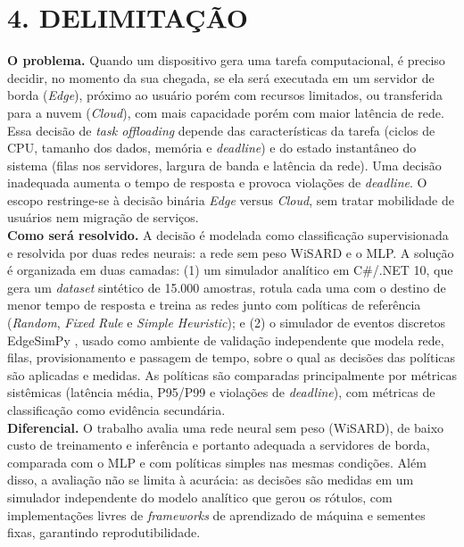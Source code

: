 \documentclass[12pt,a4paper]{article}
\begin{document}
\section*{\bfseries 4. DELIMITAÇÃO}
\textbf{O problema.} Quando um dispositivo gera uma tarefa computacional, é preciso decidir,
no momento da sua chegada, se ela será executada em um servidor de borda (\textit{Edge}),
próximo ao usuário porém com recursos limitados, ou transferida para a nuvem (\textit{Cloud}),
com mais capacidade porém com maior latência de rede. Essa decisão de \textit{task offloading}
depende das características da tarefa (ciclos de CPU, tamanho dos dados, memória e
\textit{deadline}) e do estado instantâneo do sistema (filas nos servidores, largura de banda e
latência da rede). Uma decisão inadequada aumenta o tempo de resposta e provoca violações de
\textit{deadline}. O escopo restringe-se à decisão binária \textit{Edge} versus \textit{Cloud},
sem tratar mobilidade de usuários nem migração de serviços.\\

\textbf{Como será resolvido.} A decisão é modelada como classificação supervisionada e
resolvida por duas redes neurais: a rede sem peso WiSARD e o MLP. A solução é organizada em
duas camadas: (1) um simulador analítico em C\#/.NET 10, que gera um \textit{dataset} sintético
de 15.000 amostras, rotula cada uma com o destino de menor tempo de resposta e treina as redes
junto com políticas de referência (\textit{Random}, \textit{Fixed Rule} e
\textit{Simple Heuristic}); e (2) o simulador de eventos discretos EdgeSimPy
\cite{souza2023edgesimpy}, usado como ambiente de validação independente que modela rede,
filas, provisionamento e passagem de tempo, sobre o qual as decisões das políticas são aplicadas
e medidas. As políticas são comparadas principalmente por métricas sistêmicas (latência média,
P95/P99 e violações de \textit{deadline}), com métricas de classificação como evidência
secundária.\\

\textbf{Diferencial.} O trabalho avalia uma rede neural sem peso (WiSARD), de baixo custo de
treinamento e inferência e portanto adequada a servidores de borda, comparada com o MLP e com
políticas simples nas mesmas condições. Além disso, a avaliação não se limita à acurácia: as
decisões são medidas em um simulador independente do modelo analítico que gerou os rótulos,
com implementações livres de \textit{frameworks} de aprendizado de máquina e sementes fixas,
garantindo reprodutibilidade.
\end{document}

